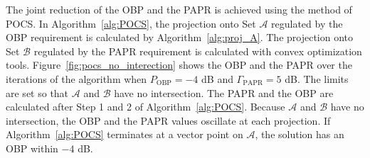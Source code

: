 \documentclass[paper]{ieice}
\begin{document}
The joint reduction of the OBP and the PAPR is achieved using the method of POCS.  In Algorithm~\ref{alg:POCS}, the projection onto Set $\mathcal{A}$ regulated by the OBP requirement is calculated by Algorithm~\ref{alg:proj_A}. The projection onto Set $\mathcal{B}$ regulated by the PAPR requirement is calculated with convex optimization tools.   Figure~\ref{fig:pocs_no_interection} shows the OBP and the PAPR over the iterations of the algorithm when $P_{\mathrm{OBP}} =  -4$ dB and $\Gamma_{\mathrm{PAPR}} =  5$ dB. The limits are set so that $\mathcal{A}$ and $\mathcal{B}$ have no intersection. The PAPR and the OBP are calculated after Step 1 and 2 of Algorithm~\ref{alg:POCS}.   Because $\mathcal{A}$ and $\mathcal{B}$ have no intersection, the OBP and the PAPR values oscillate at each projection.  If Algorithm~\ref{alg:POCS} terminates at a vector point on $\mathcal{A}$, the solution has an OBP within $-4$ dB. 

\end{document}
